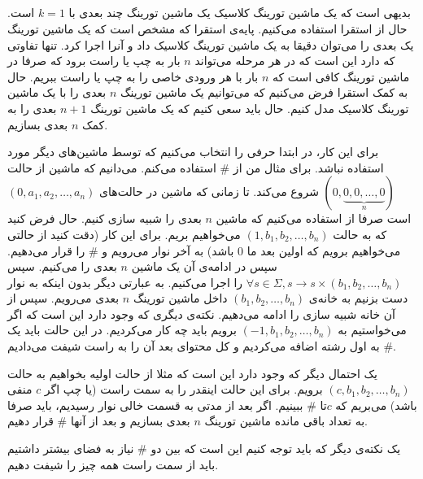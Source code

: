 \subsection{}
\subsubsection{}
بدیهی است که یک ماشین تورینگ کلاسیک یک ماشین تورینگ چند بعدی با
$k = 1$
است. حال از استقرا استفاده می‌کنیم. پایه‌ی استقرا که مشخص است که یک ماشین تورینگ یک بعدی را می‌توان
دقیقا به یک ماشین تورینگ کلاسیک داد و آنرا اجرا کرد. تنها تفاوتی که دارد این است که در هر مرحله
می‌تواند
$n$
بار به چپ یا راست برود که صرفا در ماشین تورینگ کافی است که 
$n$
بار با هر ورودی خاصی
را به چپ یا راست ببریم.
حال به کمک استقرا فرض می‌کنیم که می‌توانیم یک ماشین تورینگ
$n$
بعدی را با یک ماشین تورینگ کلاسیک مدل کنیم. حال باید سعی کنیم که یک ماشین تورینگ
$n+1$
بعدی را به کمک
$n$
بعدی بسازیم.

برای این کار، در ابتدا حرفی را انتخاب می‌کنیم که توسط ماشین‌های دیگر مورد استفاده نباشد. برای مثال من از
$\#$
استفاده می‌کنم. می‌دانیم که ماشین از حالت
$(0, \underbrace{0, 0, \dots, 0}_{n})$
شروع می‌کند. تا زمانی که ماشین در حالت‌های
$(0, a_1, a_2, \dots, a_n)$
است صرفا از
استفاده می‌کنیم که ماشین
$n$
بعدی را شبیه سازی کنیم. حال فرض کنید که به حالت
$(1, b_1, b_2, \dots, b_n)$
می‌خواهیم بریم. برای این کار
(دقت کنید از حالتی می‌خواهیم برویم که اولین بعد ما 0 باشد)
به آخر نوار می‌رویم و
$\#$
را قرار می‌دهیم. سپس در ادامه‌ی آن یک ماشین
$n$
بعدی را
می‌کنیم. سپس
$\forall s \in \Sigma, s \rightarrow s \times (b_1, b_2, \dots, b_n)$
را اجرا می‌کنیم. به عبارتی دیگر بدون اینکه به نوار دست بزنیم به خانه‌ی
$(b_1, b_2, \dots, b_n)$
داخل
ماشین تورینگ
$n$
بعدی می‌رویم. سپس از آن خانه شبیه سازی را ادامه می‌دهیم. نکته‌ی دیگری که وجود دارد این است که اگر می‌خواستیم به
$(-1, b_1, b_2, \dots, b_n)$
برویم باید چه کار می‌کردیم. در این حالت باید یک
$\#$
به اول رشته اضافه می‌کردیم و کل محتوای بعد آن را به راست شیفت می‌دادیم.

یک احتمال دیگر که وجود دارد این است که مثلا از حالت اولیه بخواهیم به حالت
$(c, b_1, b_2, \dots, b_n)$
برویم. برای این حالت اینقدر
را به سمت راست
(یا چپ اگر $c$ منفی باشد)
می‌بریم که
$c$تا
$\#$
ببینیم. اگر بعد از مدتی به قسمت خالی نوار رسیدیم، باید صرفا به تعداد باقی مانده ماشین تورینگ
$n$
بعدی بسازیم و بعد از آنها
$\#$
قرار دهیم.

یک نکته‌ی دیگر که باید توجه کنیم این است که بین دو
$\#$
نیاز به فضای بیشتر داشتیم باید از سمت راست همه چیز را شیفت دهیم.

